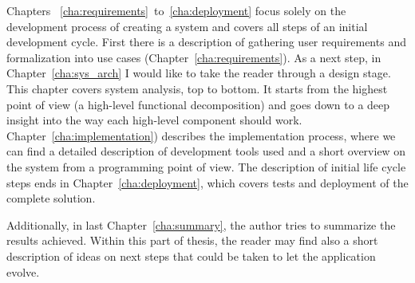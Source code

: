 Chapters ~\ref{cha:requirements}~to~\ref{cha:deployment} focus solely on the development process of creating a system and covers all steps of an initial development cycle. First there is a description of gathering user requirements and formalization into use cases (Chapter~\ref{cha:requirements}). As a next step, in Chapter~\ref{cha:sys_arch} I would like to take the reader through a design stage. This chapter covers system analysis, top to bottom. It starts from the highest point of view (a high-level functional decomposition) and goes down to a deep insight into the way each high-level component should work. Chapter~\ref{cha:implementation}) describes the implementation process, where we can find a detailed description of development tools used and a short overview on the system from a programming point of view. The description of initial life cycle steps ends in Chapter~\ref{cha:deployment}, which covers tests and deployment of the complete solution.

Additionally, in last Chapter~\ref{cha:summary}, the author tries to summarize the results achieved. Within this part of thesis, the reader may find also a short description of ideas on next steps that could be taken to let the application evolve.
